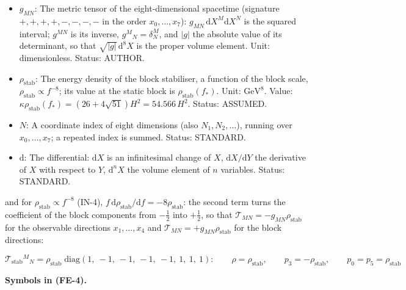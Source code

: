 \documentclass[
  10pt,
]{article}
\begin{document}
\begin{itemize}
  length. Status: AUTHOR.
\item
  \(g_{MN}\): The metric tensor of the eight-dimensional spacetime
  (signature \(+,+,+,+,-,-,-,-\) in the order \(x_0, \dots, x_7\)):
  \(g_{MN}\,\mathrm{d}X^M\mathrm{d}X^N\) is the squared interval;
  \(g^{MN}\) is its inverse, \(g^M{}_N = \delta^M_N\), and
  \(\lvert g\rvert\) the absolute value of its determinant, so that
  \(\sqrt{\lvert g\rvert}\,\mathrm{d}^8X\) is the proper volume element.
  Unit: dimensionless. Status: AUTHOR.
\item
  \(\rho_{\mathrm{stab}}\): The energy density of the block stabiliser,
  a function of the block scale,
  \(\rho_{\mathrm{stab}} \propto f^{-8}\); its value at the static block
  is \(\rho_{\mathrm{stab}}(f_*)\). Unit: \(\mathrm{GeV}^{8}\). Value:
  \(\kappa\rho_{\mathrm{stab}}(f_*) = (26 + 4\sqrt{51})H^2 = 54.566\,H^2\).
  Status: ASSUMED.
\item
  \(N\): A coordinate index of eight dimensions (also
  \(N_1, N_2, \dots\)), running over \(x_0, \dots, x_7\); a repeated
  index is summed. Status: STANDARD.
\item
  \(\mathrm{d}\): The differential: \(\mathrm{d}X\) is an infinitesimal
  change of \(X\), \(\mathrm{d}X/\mathrm{d}Y\) the derivative of \(X\)
  with respect to \(Y\), \(\mathrm{d}^nX\) the volume element of \(n\)
  variables. Status: STANDARD.
\end{itemize}

and for \(\rho_{\mathrm{stab}} \propto f^{-8}\) (IN-4),
\(f\,\mathrm{d}\rho_{\mathrm{stab}}/\mathrm{d}f = -8\rho_{\mathrm{stab}}\):
the second term turns the coefficient of the block components from
\(-\frac12\) into \(+\frac12\), so that
\(\mathcal{T}_{MN} = -g_{MN}\rho_{\mathrm{stab}}\) for the observable
directions \(x_1, \dots, x_4\) and
\(\mathcal{T}_{MN} = +g_{MN}\rho_{\mathrm{stab}}\) for the block
directions:

\[
\mathcal{T}_{\mathrm{stab}}{}^M{}_N =
 \rho_{\mathrm{stab}}\;\mathrm{diag}(1,\ -1,\ -1,\ -1,\ -1,\ 1,\ 1,\ 1):\qquad
\rho = \rho_{\mathrm{stab}},\qquad p_3 = -\rho_{\mathrm{stab}},\qquad p_0 = p_5 = \rho_{\mathrm{stab}}
 \tag{FE-4}
\]

\textbf{Symbols in (FE-4).}
\end{document}

